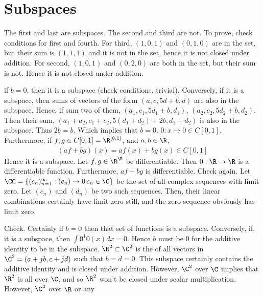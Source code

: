 \documentclass{book}
\begin{document}
\section{Subspaces}
  \begin{enumerate}[label=\arabic*)]
    \ii The first and last are subspaces. The second and third are not. To prove, check conditions for first and fourth. For third, $(1, 0, 1)$ and $(0, 1, 0)$ are in the set,
    but their sum is $(1, 1, 1)$ and it is not in the set, hence it is not closed under addition. For second, $(1, 0, 1)$ and $(0, 2, 0)$ are both in the set, but their sum is
    not. Hence it is not closed under addition.
    \ii 
      \begin{enumerate}[label=\alph*)]
        \ii if $b = 0$, then it is a subspace (check conditions, trivial). Conversely, if it is a subspace, then sums of vectors of the form $(a, c, 5d + b, d)$ are also in
        the subspace. Hence, if sum two of them, $(a_1, c_1, 5d_1 + b, d_1)$, $(a_2, c_2, 5d_2 + b, d_2)$. Then their sum, $(a_1 + a_2, c_1 + c_2, 5(d_1 + d_2) + 2b, d_1 +
        d_2)$ is also in the subspace. Thus $2b = b$. Which implies that $b = 0$.
        \ii $0: x \mapsto 0 \in C[0, 1]$. Furthermore, if $f, g \in C[0, 1] = \R^{[0, 1]}$, and $a, b \in \R$,
          \begin{align*}
            (af + bg)(x) = af(x) + bg(x) \in C[0, 1]
          \end{align*}
          Hence it is a subspace.
        \ii
          Let $f, g \in \R^{\R}$ be differentiable. Then $0: \R \to \R$ is a differentiable function. Furthermore, $af + bg$ is differentiable.
        \ii
          Check again.
        \ii
          Let $\CC = \{(c_n)_{n = 1}^{\infty}: (c_n) \to 0\, c_n \in \C\}$ be the set of all complex sequences with limit zero. Let $(c_n)$ and $(d_n)$ be two such sequences.
          Then, their linear combinations certainly have limit zero still, and the zero sequence obviously has limit zero.
      \end{enumerate}
    \ii
      Check.
    \ii Certainly if $b = 0$ then that set of functions is a subspace. Conversely, if, it is a subspace, then $\int{0}^{1}0(x)dx = 0$. Hence $b$ must be $0$ for the additive
    identity to be in the subspace.
    \ii $\R^2 \subset \C^2$ is the of all vectors in $\C^2 = (a + jb, c + jd)$ such that $b = d = 0$. This subspace certainly contains the additive identity and is closed
    under addition. However, $\C^2$ over $\C$ implies that $\R^2$ is all over $\C$, and so $\R^2$ won't be closed under scalar multiplication. However, $\C^2$ over $\R$ or any

\end{enumerate}
\end{document}
